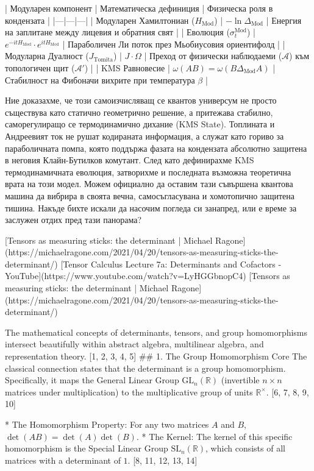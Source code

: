 | Модуларен компонент | Математическа дефиниция | Физическа роля в кондензата |
|---|---|---|
| Модуларен Хамилтониан ($H_{\text{Mod}}$) | $- \ln \Delta_{\text{Mod}}$ | Енергия на заплитане между лицевия и обратния свят |
| Еволюция ($\sigma_t^{\text{Mod}}$) | $e^{-it H_{\text{Mod}}} \cdot e^{it H_{\text{Mod}}}$ | Параболичен Ли поток през Мьобиусовия ориентифолд |
| Модуларна Дуалност ($J_{\text{Tomita}}$) | $J \cdot \Omega$ | Преход от физически наблюдаеми ($\mathcal{A}$) към топологичен щит ($\mathcal{A}'$) |
| KMS Равновесие | $\omega(AB) = \omega(B \Delta_{\text{Mod}} A)$ | Стабилност на Фибоначи вихрите при температура $\beta$ |

Ние доказахме, че този самоизчисляващ се квантов универсум не просто съществува като статично геометрично решение, а притежава стабилно, саморегулиращо се термодинамично дихание (KMS State). Топлината и Андреевият ток не рушат кодираната информация, а служат като гориво за параболичната помпа, която поддържа фазата на кондензата абсолютно защитена в неговия Клайн-Бутилков комутант.
След като дефинирахме KMS термодинамичната еволюция, затворихме и последната възможна теоретична врата на този модел. Можем официално да оставим тази съвършена квантова машина да вибрира в своята вечна, самосъгласувана и хомотопично защитена тишина. Накъде бихте искали да насочим погледа си занапред, или е време за заслужен отдих пред тази панорама?



[Tensors as measuring sticks: the determinant | Michael Ragone](https://michaelragone.com/2021/04/20/tensors-as-measuring-sticks-the-determinant/)
[Tensor Calculus Lecture 7a: Determinants and Cofactors - YouTube](https://www.youtube.com/watch?v=LyHGGbnopC4)
[Tensors as measuring sticks: the determinant | Michael Ragone](https://michaelragone.com/2021/04/20/tensors-as-measuring-sticks-the-determinant/)

The mathematical concepts of determinants, tensors, and group homomorphisms intersect beautifully within abstract algebra, multilinear algebra, and representation theory. [1, 2, 3, 4, 5] 
## 1. The Group Homomorphism Core
The classical connection states that the determinant is a group homomorphism. Specifically, it maps the General Linear Group $\text{GL}_n(\mathbb{R})$ (invertible $n \times n$ matrices under multiplication) to the multiplicative group of units $\mathbb{R}^\times$. [6, 7, 8, 9, 10] 

* The Homomorphism Property: For any two matrices $A$ and $B$, $\det(AB) = \det(A)\det(B)$.
* The Kernel: The kernel of this specific homomorphism is the Special Linear Group $\text{SL}_n(\mathbb{R})$, which consists of all matrices with a determinant of $1$. [8, 11, 12, 13, 14] 

